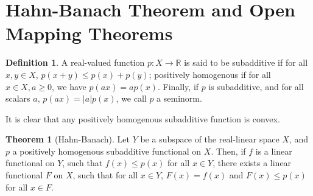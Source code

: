 \documentclass[
]{article}
\theoremstyle{definition}
\newtheorem{theorem}{Theorem}
\theoremstyle{definition}
\newtheorem{definition}{Definition}[section]
\begin{document}
\newpage
\section{Hahn-Banach Theorem and Open Mapping Theorems}

\begin{definition}
  A real-valued function \(p : X \to \mathbb{R}\) is said to be subadditive if for all 
  \(x, y \in X\), \(p(x + y) \le p(x) + p(y)\); positively homogenous if for all 
  \(x \in X, a \ge 0\), we have \(p(a x) = a p(x)\). Finally, if \(p\) is 
  subadditive, and for all scalars \(a\), \(p(a x) = |a| p(x)\), we call \(p\)
  a seminorm.
\end{definition}

It is clear that any positively homogenous subadditive function is convex. 

\begin{theorem}[Hahn-Banach]
 Let \(Y\) be a subspace of the real-linear space \(X\), and \(p\) a positively 
 homogenous subadditive functional on \(X\). Then, if \(f\) is a linear functional 
 on \(Y\), such that \(f(x) \le p(x)\) for all \(x \in Y\), there exists a linear 
 functional \(F\) on \(X\), such that for all \(x \in Y\), \(F(x) = f(x)\) and 
 \(F(x) \le p(x)\) for all \(x \in F\).
\end{theorem}
\end{document}
